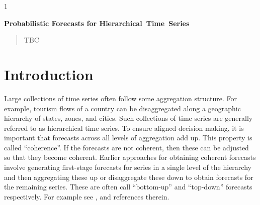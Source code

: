 \documentclass[12pt]{article}
\newcommand{\blind}{1}
\theoremstyle{definition}
\begin{document}
	\blind
	{
		\bigskip
		\bigskip
		\bigskip
		\begin{center}
			{\LARGE\bf Probabilistic Forecasts for Hierarchical~Time~Series}
		\end{center}
		\medskip
	} \fi
	
	\bigskip


\begin{abstract}
	TBC
\end{abstract}


\newpage
{} %

\section{Introduction}\label{sec:intro}

Large collections of time series often follow some aggregation structure. For example, tourism flows of a country can be disaggregated along a geographic hierarchy of states, zones, and cities. Such collections of time series are generally referred to as hierarchical time series. To ensure aligned decision making, it is important that forecasts across all levels of aggregation add up. This property is called ``coherence''. If the forecasts are not coherent, then these can be adjusted so that they become coherent. Earlier approaches for obtaining coherent forecasts involve generating first-stage forecasts for series in a single level of the hierarchy and then aggregating these up or disaggregate these down to obtain forecasts for the remaining series. These are often call ``bottom-up'' and ``top-down'' forecasts respectively. For example see \citet{Dunn1976}, \citet{Gross1990} and references therein.
\end{document}
